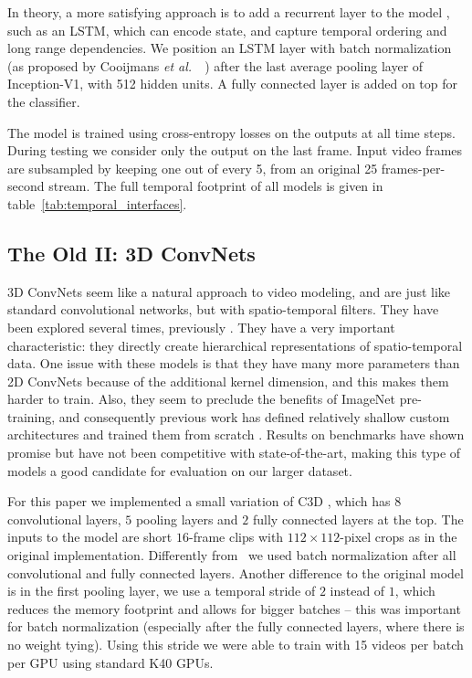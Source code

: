 \documentclass[10pt,twocolumn,letterpaper]{article}
\begin{document}
In theory, a more satisfying approach is to add a recurrent layer to the model \cite{yue2015beyond,donahue2015long}, such as an LSTM, which can encode state, and capture temporal ordering and long range dependencies. We position an LSTM layer with batch normalization (as proposed by Cooijmans {\it et al.}~\ \cite{cooijmans2016recurrent}) after the last average pooling layer of Inception-V1, with 512 hidden units. A fully connected layer is added on top for the classifier.

The model is trained using cross-entropy losses on the outputs at all time steps. During testing we consider only the output on the last frame. Input video frames are subsampled by keeping one out of every 5, from an original 25 frames-per-second stream. The full temporal footprint of all models is given in table~\ref{tab:temporal_interfaces}.

\subsection{The Old II: 3D ConvNets}

3D ConvNets seem like a natural approach to video modeling, and are
just like standard convolutional networks, but with spatio-temporal
filters. They have been explored several times, previously
\cite{taylor2010convolutional,ji20133d,tran2015learning, varol2017long}.  They have a
very important characteristic: they directly create hierarchical
representations of spatio-temporal data. One issue with these models
is that they have many more parameters than 2D ConvNets because of the
additional kernel dimension, and this makes them harder to train.
Also, they seem to preclude the benefits of ImageNet pre-training, and
consequently previous work has defined relatively shallow custom architectures and
trained them from scratch
\cite{taylor2010convolutional,ji20133d,tran2015learning,karpathy2014large}. Results
on benchmarks have shown promise but have not been competitive with
state-of-the-art, making this type of models a good candidate for
evaluation on our larger dataset.

For this paper we implemented a small variation of C3D
\cite{tran2015learning}, which has $8$ convolutional layers, $5$
pooling layers and $2$ fully connected layers at the top. The inputs
to the model are short $16$-frame clips with $112 \times 112$-pixel crops
as in the original implementation. 
Differently from~\cite{tran2015learning} we used batch
normalization after all convolutional and fully connected
layers. Another difference to the original model is in the first
pooling layer,   we use a temporal stride of $2$ instead of $1$,
which reduces the memory footprint and allows for bigger batches --
this was important for batch normalization (especially after the fully
connected layers, where there is no weight tying). Using this stride
we were able to train with 15 videos per batch per GPU using standard
K40 GPUs.
\end{document}
